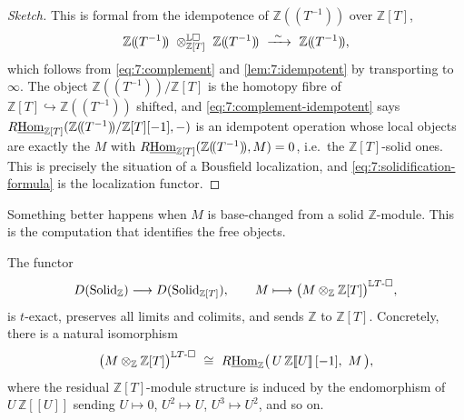 \begin{proof}[Sketch]
This is formal from the idempotence of $\mathbb{Z}(\!(T^{-1})\!)$ over
$\mathbb{Z}[T]$,
\begin{equation}
\label{eq:7:complement-idempotent}
\mathbb{Z}(\!(T^{-1})\!)\ \otimes^{\mathbb{L}\solid}_{\mathbb{Z}[T]}\
\mathbb{Z}(\!(T^{-1})\!)\ \xrightarrow{\ \sim\ }\ \mathbb{Z}(\!(T^{-1})\!),
\end{equation}
which follows from \eqref{eq:7:complement} and \cref{lem:7:idempotent} by
transporting to $\infty$. The object $\mathbb{Z}(\!(T^{-1})\!)/\mathbb{Z}[T]$
is the homotopy fibre of $\mathbb{Z}[T]\hookrightarrow\mathbb{Z}(\!(T^{-1})\!)$
shifted, and \eqref{eq:7:complement-idempotent} says $R\underline{\operatorname{Hom}}_{\mathbb{Z}[T]}
(\mathbb{Z}(\!(T^{-1})\!)/\mathbb{Z}[T][-1],-)$ is an idempotent operation
whose local objects are exactly the $M$ with
$R\underline{\operatorname{Hom}}_{\mathbb{Z}[T]}(\mathbb{Z}(\!(T^{-1})\!),M)=0$, i.e.\ the
$\mathbb{Z}[T]$-solid ones. This is precisely the situation of a Bousfield
localization, and \eqref{eq:7:solidification-formula} is the localization
functor.
\end{proof}

Something better happens when $M$ is base-changed from a solid
$\mathbb{Z}$-module. This is the computation that identifies the free objects.

\begin{proposition}
\label{prop:7:pushforward}
The functor
\begin{equation}
\label{eq:7:pushforward}
D(\mathrm{Solid}_{\mathbb{Z}})\longrightarrow D(\mathrm{Solid}_{\mathbb{Z}[T]}),\qquad
M\longmapsto\bigl(M\otimes_{\mathbb{Z}}\mathbb{Z}[T]\bigr)^{\mathbb{L}T\text{-}\square},
\end{equation}
is $t$-exact, preserves all limits and colimits, and sends $\mathbb{Z}$ to
$\mathbb{Z}[T]$. Concretely, there is a natural isomorphism
\begin{equation}
\label{eq:7:pushforward-formula}
\bigl(M\otimes_{\mathbb{Z}}\mathbb{Z}[T]\bigr)^{\LTsolid}\ \cong\
R\iHom_{\mathbb{Z}}\bigl(\,U\,\mathbb{Z}[\![U]\!]\,[-1],\ M\,\bigr),
\end{equation}
where the residual $\mathbb{Z}[T]$-module structure is induced by the
endomorphism of $U\,\mathbb{Z}[\![U]\!]$ sending $U\mapsto0$, $U^2\mapsto U$,
$U^3\mapsto U^2$, and so on.
\end{proposition}

